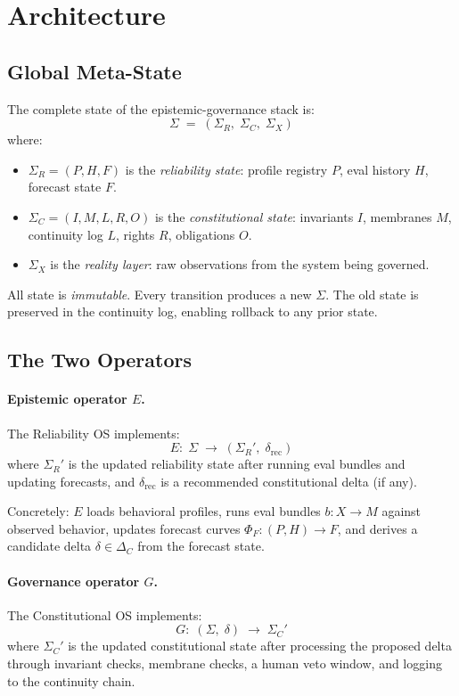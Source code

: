 \documentclass[11pt]{article}
\begin{document}
\section{Architecture}
\label{sec:architecture}

\subsection{Global Meta-State}

The complete state of the epistemic-governance stack is:
\[
  \Sigma \;=\; (\Sigma_R,\; \Sigma_C,\; \Sigma_X)
\]
where:
\begin{itemize}
  \item $\Sigma_R = (P, H, F)$ is the \emph{reliability state}:
    profile registry $P$, eval history $H$, forecast state $F$.
  \item $\Sigma_C = (I, M, L, R, O)$ is the \emph{constitutional state}:
    invariants $I$, membranes $M$, continuity log $L$,
    rights $R$, obligations $O$.
  \item $\Sigma_X$ is the \emph{reality layer}: raw observations
    from the system being governed.
\end{itemize}

All state is \emph{immutable}. Every transition produces a new
$\Sigma$. The old state is preserved in the continuity log,
enabling rollback to any prior state.

\subsection{The Two Operators}

\paragraph{Epistemic operator $E$.}
The Reliability OS implements:
\[
  E:\; \Sigma \;\to\; (\Sigma_R',\; \delta_{\mathrm{rec}})
\]
where $\Sigma_R'$ is the updated reliability state after running
eval bundles and updating forecasts, and $\delta_{\mathrm{rec}}$
is a recommended constitutional delta (if any).

Concretely: $E$ loads behavioral profiles, runs eval bundles
$b: X \to M$ against observed behavior, updates forecast curves
$\Phi_F: (P, H) \to F$, and derives a candidate delta
$\delta \in \Delta_C$ from the forecast state.

\paragraph{Governance operator $G$.}
The Constitutional OS implements:
\[
  G:\; (\Sigma,\; \delta) \;\to\; \Sigma_C'
\]
where $\Sigma_C'$ is the updated constitutional state after
processing the proposed delta through invariant checks,
membrane checks, a human veto window, and logging to the
continuity chain.
\end{document}
